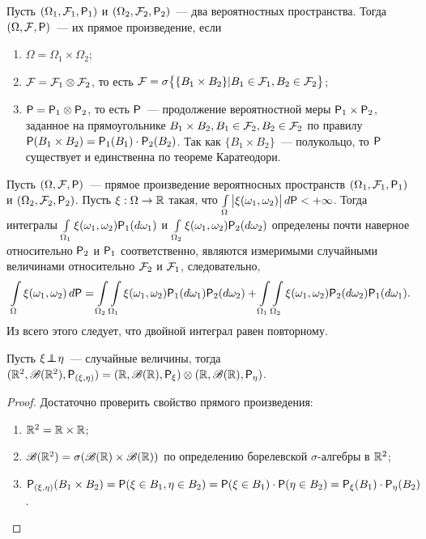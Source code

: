 \begin{definition}
	Пусть $(\Omega_1, \F_1, \P_1)$ и $(\Omega_2, \F_2, \P_2)$~--- два вероятностных пространства. Тогда $(\Omega, \F, \P)$~--- их прямое произведение, если 
	\begin{enumerate}
		\item $\Omega = \Omega_1 \times \Omega_2$;
		\item $\F = \F_1 \otimes \F_2$, то есть $\F = \sigma\big\{ \{ B_1 \times B_2 \} | B_1 \in \F_1, B_2 \in \F_2 \big\}$;
		\item $\P = \P_1 \otimes \P_2$, то есть  $\P$~--- продолжение вероятностной меры $\P_1 \times \P_2$, заданное на прямоугольнике $B_1 \times B_2, B_1 \in \F_2, B_2 \in \F_2$ по правилу $\P(B_1 \times B_2) = \P_1 (B_1) \cdot \P_2 (B_2)$. Так как $\{B_1 \times B_2 \}$~--- полукольцо, то $\P$ существует и единственна по теореме Каратеодори.
	\end{enumerate}
\end{definition}
\begin{theorem}[Фубини][б/д]
	Пусть $(\Omega, \F, \P)$~--- прямое произведение вероятносных пространств $(\Omega_1, \F_1, \P_1)$ и $(\Omega_2, \F_2, \P_2)$. Пусть $\xi : \Omega \rightarrow \R$ такая, что $\int\limits_\Omega \big| \xi (\omega_1, \omega_2) \big| \, d \P < + \infty$. Тогда интегралы $\int\limits_{\Omega_1} \xi (\omega_1, \omega_2) \P_1 (d \omega_1)$ и $\int\limits_{\Omega_2} \xi(\omega_1, \omega_2) \P_2 (d \omega_2)$ определены почти наверное относительно $\P_2$ и $\P_1$ соответственно, являются измеримыми случайными величинами относительно $\F_2$ и $\F_1$, следовательно, 
	$$\int\limits_\Omega \xi (\omega_1, \omega_2) \, d \P = \int\limits_{\Omega_2} \int\limits_{\Omega_1} \xi (\omega_1, \omega_2) \P_1 (d \omega_1) \P_2 (d \omega_2) + \int\limits_{\Omega_1} \int\limits_{\Omega_2} \xi(\omega_1, \omega_2) \P_2 (d \omega_2) \P_1 (d \omega_1).$$
	 Из всего этого следует, что двойной интеграл равен повторному.
\end{theorem}
\begin{statement}
 	Пусть $\xi \indep \eta$~--- случайные величины, тогда $(\R^2, \B(\R^2), \P_{(\xi, \eta)}) = (\R, \B(\R), \P_\xi) \otimes (\R, \B(\R), \P_\eta)$.
 	\begin{proof} Достаточно проверить свойство прямого произведения:
 		\begin{enumerate}
 			\item $\R^2 = \R \times \R$;
 			\item $\B(\R^2) = \sigma(\B(\R) \times \B(\R))$ по определению борелевской $\sigma$-алгебры в $\R^2$;
 			\item $\P_{(\xi, \eta)} (B_1 \times B_2) = \P(\xi \in B_1, \eta \in B_2) = \P(\xi \in B_1) \cdot \P(\eta \in B_2) = \P_\xi(B_1) \cdot \P_\eta (B_2)$. \qedhere
 		\end{enumerate}
 	\end{proof}
\end{statement}
